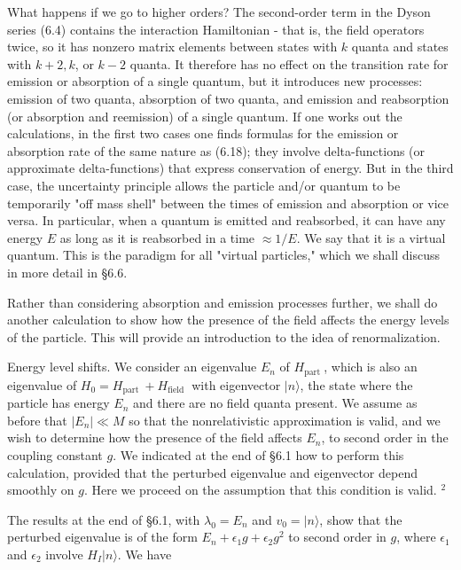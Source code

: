 \documentclass[10pt, letterpaper]{article}
\begin{document}
What happens if we go to higher orders? The second-order term in the Dyson series (6.4) contains the interaction Hamiltonian - that is, the field operators twice, so it has nonzero matrix elements between states with $k$ quanta and states with $k+2, k$, or $k-2$ quanta. It therefore has no effect on the transition rate for emission or absorption of a single quantum, but it introduces new processes: emission of two quanta, absorption of two quanta, and emission and reabsorption (or absorption and reemission) of a single quantum. If one works out the calculations, in the first two cases one finds formulas for the emission or absorption rate of the same nature as (6.18); they involve delta-functions (or approximate delta-functions) that express conservation of energy. But in the third case, the uncertainty principle allows the particle and/or quantum to be temporarily "off mass shell" between the times of emission and absorption or vice versa. In particular, when a quantum is emitted and reabsorbed, it can have any energy $E$ as long as it is reabsorbed in a time $\approx 1 / E$. We say that it is a virtual quantum. This is the paradigm for all "virtual particles," which we shall discuss in more detail in §6.6.

Rather than considering absorption and emission processes further, we shall do another calculation to show how the presence of the field affects the energy levels of the particle. This will provide an introduction to the idea of renormalization.

Energy level shifts. We consider an eigenvalue $E_{n}$ of $H_{\text {part }}$, which is also an eigenvalue of $H_{0}=H_{\text {part }}+H_{\text {field }}$ with eigenvector $|n\rangle$, the state where the particle has energy $E_{n}$ and there are no field quanta present. We assume as before that $\left|E_{n}\right| \ll M$ so that the nonrelativistic approximation is valid, and we wish to determine how the presence of the field affects $E_{n}$, to second order in the coupling constant $g$. We indicated at the end of §6.1 how to perform this calculation, provided that the perturbed eigenvalue and eigenvector depend smoothly on $g$. Here we proceed on the assumption that this condition is valid. ${ }^{2}$

The results at the end of §6.1, with $\lambda_{0}=E_{n}$ and $v_{0}=|n\rangle$, show that the perturbed eigenvalue is of the form $E_{n}+\epsilon_{1} g+\epsilon_{2} g^{2}$ to second order in $g$, where $\epsilon_{1}$ and $\epsilon_{2}$ involve $H_{I}|n\rangle$. We have
\end{document}
